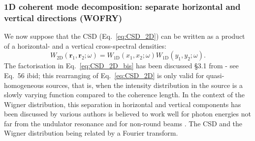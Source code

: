 \documentclass{iucr}              %
\begin{document}
\subsubsection{1D coherent mode decomposition: separate horizontal and vertical directions (WOFRY)\\}

We now suppose that the CSD (Eq.~\ref{eq:CSD_2D}) can be written as a product of a horizontal- and a vertical cross-spectral densities: 
\begin{equation}
W_\text{2D}(\textbf{r}_1,\textbf{r}_2;\omega) = W_\text{1D}(x_1,x_2;\omega)W_\text{1D}(y_1,y_2;\omega).
\label{eq:CSD_2D_bis}
\end{equation}
The factorisation in Eq.~\ref{eq:CSD_2D_bis} has been discussed §3.1 from \cite{geloni2008} - see Eq.~56 ibid; this rearranging of Eq.~\ref{eq:CSD_2D} is only valid for quasi-homogeneous sources, that is, when the intensity distribution in the source is a slowly varying function compared to the coherence length. In the context of the Wigner distribution, this separation in horizontal and vertical components has been discussed by various authors is believed to work well for photon energies not far from the undulator resonance and for non-round beams \cite{tanaka2014,nash2021}. The CSD and the Wigner distribution being related by a Fourier transform. 
\end{document}
